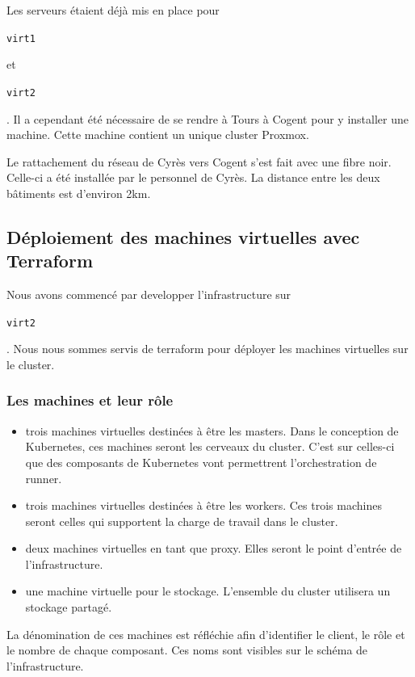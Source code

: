 \documentclass[12pt, a4paper, twoside]{article}
\begin{document}
Les serveurs étaient déjà mis en place pour \begin{code}\texttt{virt1}\end{code} et \begin{code}\texttt{virt2}\end{code}. 
Il a cependant été nécessaire de se rendre à Tours à Cogent pour y installer une machine. 
Cette machine contient un unique \gls{cluster} \gls{Proxmox}. 

Le rattachement du réseau de Cyrès vers Cogent s'est fait avec une fibre noir.
Celle-ci a été installée par le personnel de Cyrès.
La distance entre les deux bâtiments est d'environ 2km.

\subsection{Déploiement des machines virtuelles avec Terraform}
Nous avons commencé par developper l'infrastructure sur \begin{code}\texttt{virt2}\end{code}. 
Nous nous sommes servis de terraform pour déployer les machines virtuelles sur le \gls{cluster}. 

\subsubsection{Les machines et leur rôle}
\begin{itemize}
    \item trois machines virtuelles destinées à être les masters. 
    Dans le conception de \gls{Kubernetes}, ces machines seront les cerveaux du \gls{cluster}.
    C'est sur celles-ci que des composants de \gls{Kubernetes} vont permettrent l'orchestration de runner.
    \item trois machines virtuelles destinées à être les workers. 
    Ces trois machines seront celles qui supportent la charge de travail dans le \gls{cluster}.
    \item deux machines virtuelles en tant que proxy. 
    Elles seront le point d'entrée de l'infrastructure. 
    \item une machine virtuelle pour le stockage. 
    L'ensemble du \gls{cluster} utilisera un stockage partagé.
\end{itemize}

La dénomination de ces machines est réfléchie afin d'identifier le client, le rôle et le nombre de chaque composant. 
Ces noms sont visibles sur le schéma de l'infrastructure.
\end{document}
